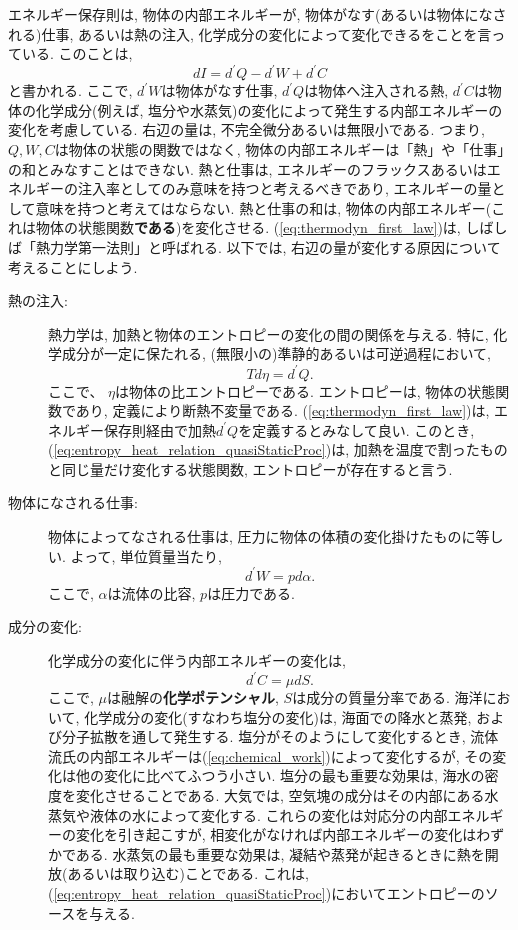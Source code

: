 エネルギー保存則は, 物体の内部エネルギーが, 
物体がなす(あるいは物体になされる)仕事, あるいは熱の注入, 化学成分の変化によって変化できるをことを言っている. 
このことは, 
\begin{equation}
  dI = {d}^\prime Q - d^\prime W + d^\prime C
\label{eq:thermodyn_first_law}
\end{equation}
と書かれる. 
ここで, $d^\prime W$は物体がなす仕事, 
$d^\prime Q$は物体へ注入される熱, 
$d^\prime C$は物体の化学成分(例えば, 塩分や水蒸気)の変化によって発生する内部エネルギーの変化を考慮している. 
右辺の量は, 不完全微分あるいは無限小である. 
つまり, $Q,W,C$は物体の状態の関数ではなく, 物体の内部エネルギーは「熱」や「仕事」の和とみなすことはできない. 
熱と仕事は, エネルギーのフラックスあるいはエネルギーの注入率としてのみ意味を持つと考えるべきであり, 
エネルギーの量として意味を持つと考えてはならない. 
熱と仕事の和は, 物体の内部エネルギー(これは物体の状態関数\textbf{である})を変化させる. 
(\ref{eq:thermodyn_first_law})は, しばしば「熱力学第一法則」と呼ばれる. 
以下では, 右辺の量が変化する原因について考えることにしよう. 
\begin{description}
 \item[熱の注入:] 
熱力学は, 加熱と物体のエントロピーの変化の間の関係を与える. 
特に, 化学成分が一定に保たれる, (無限小の)準静的あるいは可逆過程において,
\begin{equation}
  Td\eta = d^\prime Q. 
\label{eq:entropy_heat_relation_quasiStaticProc}
\end{equation}
ここで、 $\eta$は物体の比エントロピーである. 
エントロピーは, 物体の状態関数であり, 定義により断熱不変量である. 
(\ref{eq:thermodyn_first_law})は, エネルギー保存則経由で加熱$d^\prime Q$を定義するとみなして良い. 
このとき, (\ref{eq:entropy_heat_relation_quasiStaticProc})は, 
加熱を温度で割ったものと同じ量だけ変化する状態関数, エントロピーが存在すると言う. 
 \item[物体になされる仕事:] 
物体によってなされる仕事は, 圧力に物体の体積の変化掛けたものに等しい. 
よって, 単位質量当たり, 
\begin{equation}
  d^\prime W = pd\alpha. 
\end{equation}
ここで, $\alpha$は流体の比容, $p$は圧力である. 
 \item[成分の変化:] 
化学成分の変化に伴う内部エネルギーの変化は, 
\begin{equation}
  d^\prime C = \mu dS. 
\label{eq:chemical_work}
\end{equation}
ここで, $\mu$は融解の\textbf{化学ポテンシャル}, $S$は成分の質量分率である. 
海洋において, 化学成分の変化(すなわち塩分の変化)は, 
海面での降水と蒸発, および分子拡散を通して発生する. 
塩分がそのようにして変化するとき, 
流体流氏の内部エネルギーは(\ref{eq:chemical_work})によって変化するが, 
その変化は他の変化に比べてふつう小さい. 
塩分の最も重要な効果は, 海水の密度を変化させることである. 
大気では, 空気塊の成分はその内部にある水蒸気や液体の水によって変化する. 
これらの変化は対応分の内部エネルギーの変化を引き起こすが, 
相変化がなければ内部エネルギーの変化はわずかである. 
水蒸気の最も重要な効果は, 凝結や蒸発が起きるときに熱を開放(あるいは取り込む)ことである. 
これは, (\ref{eq:entropy_heat_relation_quasiStaticProc})においてエントロピーのソースを与える. 
\end{description}
